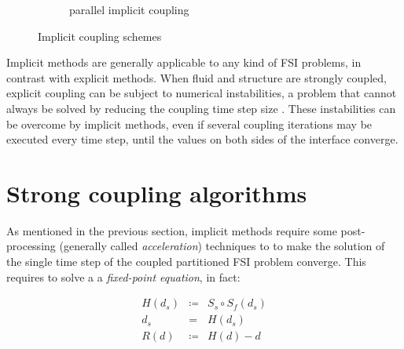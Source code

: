 \begin{figure}[htbp!]
\begin{subfigure}{.8\textwidth}
		\caption{parallel implicit coupling}
		\label{fig:parallel-implicit}
	\end{subfigure}
	\caption{Implicit coupling schemes}
\end{figure}

Implicit methods are generally applicable to any kind of FSI problems, in contrast with explicit methods. When fluid and structure are strongly coupled, explicit coupling can be subject to numerical instabilities, a problem that cannot always be solved by reducing the coupling time step size \cite{van2009added}. These instabilities can be overcome by implicit methods, even if several coupling iterations may be executed every time step, until the values on both sides of the interface converge.


\section{Strong coupling algorithms}
\label{sec:strong-coupling}

As mentioned in the previous section, implicit methods require some post-processing (generally called \textit{acceleration}) techniques to to make the solution of the single time step of the coupled partitioned FSI problem converge. This requires to solve a a \textit{fixed-point equation}, in fact:

\begin{subequations}
	\begin{eqnarray}
		\label{eq:fp-def}
		H(d_s) &\coloneqq&  S_s  \circ S_f(d_s)  \\
		\label{eq:fp-2}
		d_s &=& H(d_s)  \\
		\label{eq:fp3}
		R(d) &\coloneqq& H(d) - d
	\end{eqnarray} 
	\label{eq:fp-equations}
\end{subequations}


